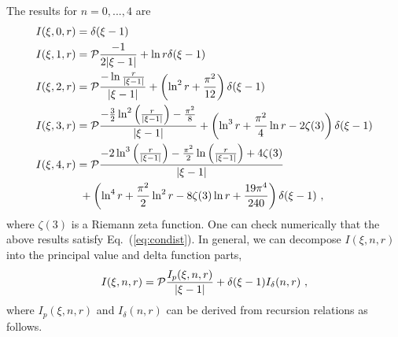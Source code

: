 \documentclass[a4paper,11pt]{article}
\begin{document}
The results for $n=0,...,4$ are
\begingroup
\allowdisplaybreaks
\begin{align}
&I(\xi, 0,r) = \delta(\xi-1) \nonumber\\
&I(\xi, 1,r) = {\cal P}\frac{-1}{2|\xi-1|} + \ln r \delta(\xi-1) \nonumber\\
&I(\xi, 2,r) = {\cal P}\frac{-\ln\frac{r}{|\xi-1|}}{|\xi-1|} + \left(\ln^2 r + \frac{\pi^2}{12}\right)\delta(\xi-1) \nonumber\\
&I(\xi, 3,r) = {\cal P}\frac{-\frac{3}{2} \ln ^2\left(\frac{r}{\left| \xi -1\right| }\right)-\frac{\pi ^2}{8}}{\left| \xi -1\right|}+ \left(\ln^3 r+\frac{\pi ^2}{4} \ln r - 2 \zeta (3)\right) \delta (\xi -1)\nonumber\\
&I(\xi, 4,r) = {\cal P}\frac{-2 \ln ^3\left(\frac{r}{\left| \xi -1\right| }\right)-\frac{\pi^2}{2} \ln \left(\frac{r}{\left| \xi-1\right| }\right)+4 \zeta (3)}{\left| \xi -1\right| } \nonumber\\
&\quad \quad \quad \quad + \left(\ln^4 r +\frac{\pi^2}{2} \ln^2 r - 8 \zeta (3) \ln r+\frac{19 \pi ^4}{240}\right) \delta (\xi -1) \ ,
\end{align}
\endgroup
where $\zeta(3)$ is a Riemann zeta function. One can check numerically that the above results satisfy Eq.~(\ref{eq:condist}). In general, we can decompose $I(\xi, n,r)$ into the principal value and delta function parts, 
\begin{align}\label{eq:Inr}
I(\xi, n,r) = {\cal P} \frac{I_{p}(\xi, n,r)}{|\xi-1|} + \delta(\xi-1)I_{\delta}(n,r) \ , 
\end{align}  
where $I_p(\xi, n, r)$ and $I_\delta (n,r)$ can be derived from recursion relations as follows.
\end{document}
